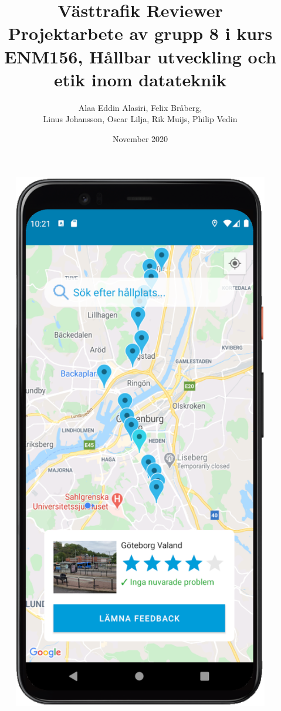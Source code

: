 \documentclass{article}
\title{
  Västtrafik Reviewer \\
  \large Projektarbete av grupp 8 i kurs ENM156, Hållbar utveckling och etik inom datateknik }
\author{Alaa Eddin Alasiri, Felix Bråberg, \\Linus Johansson, Oscar Lilja, Rik Muijs, Philip Vedin}
\date{November 2020}
\begin{document}
\maketitle

\begin{figure}[h]
\centering
\begin{minipage}{.47\textwidth}
  \centering
  \includegraphics[width=.92\linewidth]{documentation/images/Info_card.png}

\end{minipage}
\end{figure}
\end{document}
